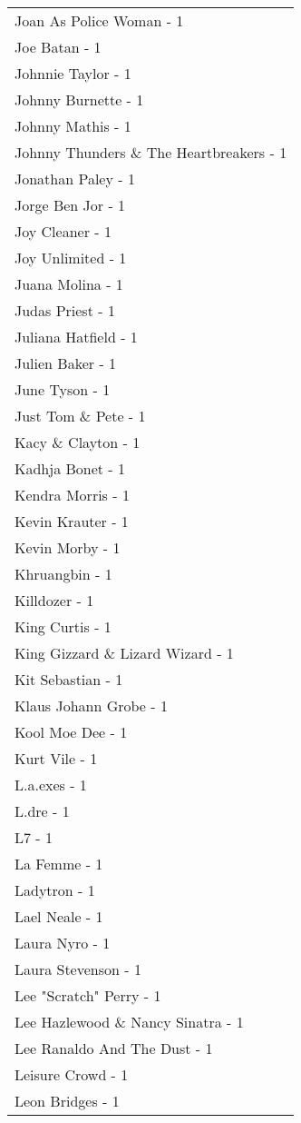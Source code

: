 \documentclass[
]{article}
\begin{document}
\begin{longtable}{l}
Joan As Police Woman - 1 \\ 
Joe Batan - 1 \\ 
Johnnie Taylor - 1 \\ 
Johnny Burnette - 1 \\ 
Johnny Mathis - 1 \\ 
Johnny Thunders \& The Heartbreakers - 1 \\ 
Jonathan Paley - 1 \\ 
Jorge Ben Jor - 1 \\ 
Joy Cleaner - 1 \\ 
Joy Unlimited - 1 \\ 
Juana Molina - 1 \\ 
Judas Priest - 1 \\ 
Juliana Hatfield - 1 \\ 
Julien Baker - 1 \\ 
June Tyson - 1 \\ 
Just Tom \& Pete - 1 \\ 
Kacy \& Clayton - 1 \\ 
Kadhja Bonet - 1 \\ 
Kendra Morris - 1 \\ 
Kevin Krauter - 1 \\ 
Kevin Morby - 1 \\ 
Khruangbin - 1 \\ 
Killdozer - 1 \\ 
King Curtis - 1 \\ 
King Gizzard \& Lizard Wizard - 1 \\ 
Kit Sebastian - 1 \\ 
Klaus Johann Grobe - 1 \\ 
Kool Moe Dee - 1 \\ 
Kurt Vile - 1 \\ 
L.a.exes - 1 \\ 
L.dre - 1 \\ 
L7 - 1 \\ 
La Femme - 1 \\ 
Ladytron - 1 \\ 
Lael Neale - 1 \\ 
Laura Nyro - 1 \\ 
Laura Stevenson - 1 \\ 
Lee "Scratch" Perry - 1 \\ 
Lee Hazlewood \& Nancy Sinatra - 1 \\ 
Lee Ranaldo And The Dust - 1 \\ 
Leisure Crowd - 1 \\ 
Leon Bridges - 1 \\ 

\end{longtable}
\end{document}
